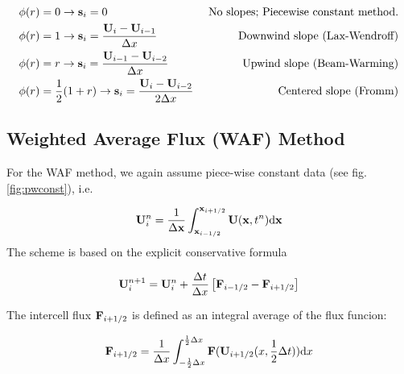 \begin{align*}
	\phi(r) & = 0 \rightarrow \mathbf{s}_i = 0 
		&\text{ No slopes; Piecewise constant method.}\\
	\phi(r) & = 1 \rightarrow \mathbf{s}_i = \frac{\mathbf{U}_{i} - \mathbf{U}_{i-1}}{\Delta x} 
		&\text{ Downwind slope (Lax-Wendroff)} \\
	\phi(r) & = r \rightarrow \mathbf{s}_i = \frac{\mathbf{U}_{i-1} - \mathbf{U}_{i-2}}{\Delta x} 
		&\text{Upwind slope (Beam-Warming)} \\
	\phi(r) & = \frac{1}{2} (1 + r) \rightarrow \mathbf{s}_i = \frac{\mathbf{U}_{i} - \mathbf{U}_{i-2}}{2 \Delta x} 
		&\text{ Centered slope (Fromm)} \\
\end{align*}

















\subsection{Weighted Average Flux (WAF) Method}



For the WAF method, we again assume piece-wise constant data (see fig. \ref{fig:pwconst}), i.e.

\begin{equation}
	\mathbf{U}_i ^ n = \frac{1}{\Delta \mathbf{x}} \int_{\mathbf{x}_{i-1/2}}^{\mathbf{x}_{i+1/2}} \mathbf{U}(\mathbf{x}, t^n) \mathrm{d} \mathbf{x}
\end{equation}
The scheme is based on the explicit conservative formula

\begin{equation}
	\mathbf{U}_{i}^{n+1} = \mathbf{U}_i^n + \frac{\Delta t}{\Delta x} \left[ \mathbf{F}_{i - 1/2} - \mathbf{F}_{i + 1/2} \right]
\end{equation}



The intercell flux $\mathbf{F}_{i + 1/2}$ is defined as an integral average of the flux funcion:

\begin{equation}
	\mathbf{F}_{i + 1/2} = \frac{1}{\Delta x} \int_{-\frac{1}{2} \Delta x} ^{\frac{1}{2} \Delta x} \mathbf{F} (\mathbf{U}_{i+1/2} ( x, \frac{1}{2}\Delta t)) \mathrm{d} x
\end{equation}

